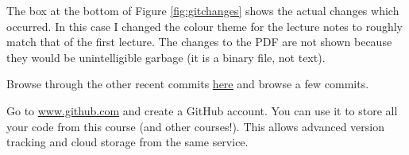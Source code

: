 \documentclass{lab}
\begin{document}
The box at the bottom of Figure \ref{fig:gitchanges} shows the actual changes which occurred. In this case I changed the colour theme for the lecture notes to roughly match that of the first lecture. The changes to the PDF are not shown because they would be unintelligible garbage (it is a binary file, not text).

Browse through the other recent commits \underline{\href{https://github.com/bschulznewy/engg1003/commits/master}{here}} and browse a few commits.

\begin{task}{}{} Go to \url{www.github.com} and create a GitHub account. You can use it to store all your code from this course (and other courses!). This allows advanced version tracking and cloud storage from the same service.
\end{task}
\end{document}
